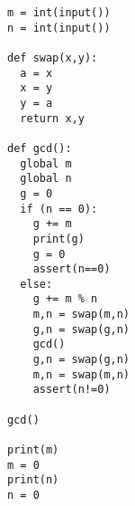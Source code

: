\begin{verbatim}
m = int(input())
n = int(input())

def swap(x,y):
  a = x
  x = y
  y = a
  return x,y

def gcd():
  global m
  global n
  g = 0
  if (n == 0):
    g += m
    print(g)
    g = 0
    assert(n==0)
  else:
    g += m % n
    m,n = swap(m,n)
    g,n = swap(g,n)
    gcd()
    g,n = swap(g,n)
    m,n = swap(m,n)
    assert(n!=0)
  
gcd()  

print(m)
m = 0
print(n)
n = 0
\end{verbatim}

